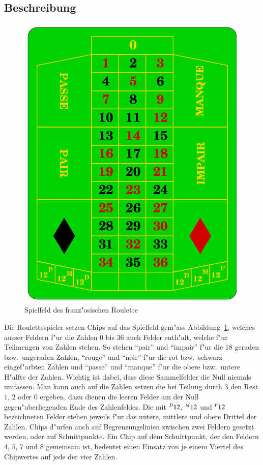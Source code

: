\subsection{Beschreibung}
\begin{figure}
\begin{center}
\includegraphics[height=10truecm]{graphics/Roulette_frz}
\end{center}
\caption{Spielfeld des franz"osischen Roulette\label{roulette-feld}}
\end{figure}
Die Roulettespieler setzen Chips auf das Spielfeld gem"ass Abbildung~\ref{roulette-feld}, welches ausser Feldern
f"ur die Zahlen 0 bis 36 auch Felder enth"alt, welche f"ur Teilmengen
von Zahlen stehen. So stehen ``pair'' und ``impair'' f"ur die 18 geraden
bzw.~ungeraden Zahlen, ``rouge'' und ``noir'' f"ur die rot bzw.~schwarz
eingef"arbten Zahlen und ``passe'' und ``manque'' f"ur die obere bzw.~untere
H"alfte der Zahlen. Wichtig ist dabei, dass diese Sammelfelder die
Null niemals umfassen. Man kann auch auf die Zahlen setzen die bei Teilung
durch $3$ den Rest $1$, $2$ oder $0$ ergeben, dazu dienen die leeren
Felder am der Null gegen"uberliegenden Ende des Zahlenfeldes.
Die mit $\mathstrut^D12$, $\mathstrut^M12$ und $\mathstrut^P12$
bezeichneten Felder stehen jeweils f"ur das untere, mittlere und obere
Drittel der Zahlen. Chips d"urfen auch auf Begrenzungslinien zwischen zwei
Feldern gesetzt werden, oder auf Schnittpunkte.
Ein Chip auf dem Schnittpunkt, der den Feldern $4$, $5$, $7$ und $8$
gemeinsam ist, bedeutet einen Einsatz von je einem Viertel des
Chipwertes auf jede der vier Zahlen.

